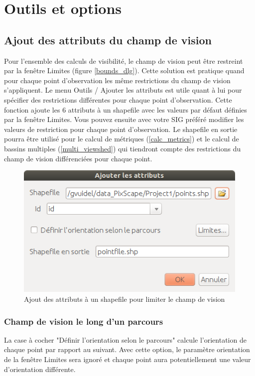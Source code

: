 \documentclass{report}
\begin{document}
\section{Outils et options}
\label{tools}

\subsection{Ajout des attributs du champ de vision}
\label{add_attributes}
Pour l'ensemble des calculs de visibilité, le champ de vision peut être restreint par la fenêtre Limites (figure \ref{bounds_dlg}). Cette solution est pratique quand pour chaque point d'observation les même restrictions du champ de vision s'appliquent. 
Le menu Outils / Ajouter les attributs est utile quant à lui pour spécifier des restrictions différentes pour chaque point d'observation. Cette fonction ajoute les 6 attributs à un shapefile avec les valeurs par défaut définies par la fenêtre Limites. Vous pouvez ensuite avec votre SIG préféré modifier les valeurs de restriction pour chaque point d'observation. 
Le shapefile en sortie pourra être utilisé pour le calcul de métriques (\ref{calc_metrics}) et le calcul de bassins multiples (\ref{multi_viewshed}) qui tiendront compte des restrictions du champ de vision différenciées pour chaque point.

\begin{figure}[H]
	\includegraphics[scale=0.5]{img/add_attributes-fr.png} 
	\caption{Ajout des attributs à un shapefile pour limiter le champ de vision}
	\label{add_attributes_dlg}
\end{figure}

\subsubsection{Champ de vision le long d'un parcours}
La case à cocher "Définir l'orientation selon le parcours" calcule l'orientation de chaque point par rapport au suivant. Avec cette option, le paramètre orientation de la fenêtre Limites sera ignoré et chaque point aura potentiellement une valeur d'orientation différente. 
\end{document}
